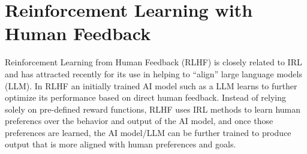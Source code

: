 \section{Reinforcement Learning with Human Feedback\label{sec:rlhf}}

Reinforcement Learning from Human Feedback (RLHF) is closely related to IRL and has attracted recently
for its use in helping to ``align'' large language models (LLM). In RLHF an initially
trained AI model such as a LLM learns to further optimize its performance based on direct human feedback.
Instead of relying solely on pre-defined reward functions, RLHF uses IRL methods to learn human preferencs
over the behavior and output of the AI model, and once those preferences are learned, the AI model/LLM
can be further trained to produce output that is more aligned with human preferences and goals.

